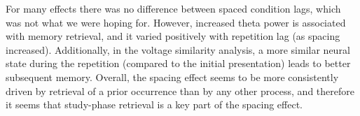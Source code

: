 For many effects there was no difference between spaced condition lags, which was not what we were hoping for.  However, increased theta power is associated with memory retrieval, and it varied positively with repetition lag (as spacing increased).  Additionally, in the voltage similarity analysis, a more similar neural state during the repetition (compared to the initial presentation) leads to better subsequent memory.   Overall, the spacing effect seems to be more consistently driven by retrieval of a prior occurrence than by any other process, and therefore it seems that study-phase retrieval is a key part of the spacing effect.
\cbend




